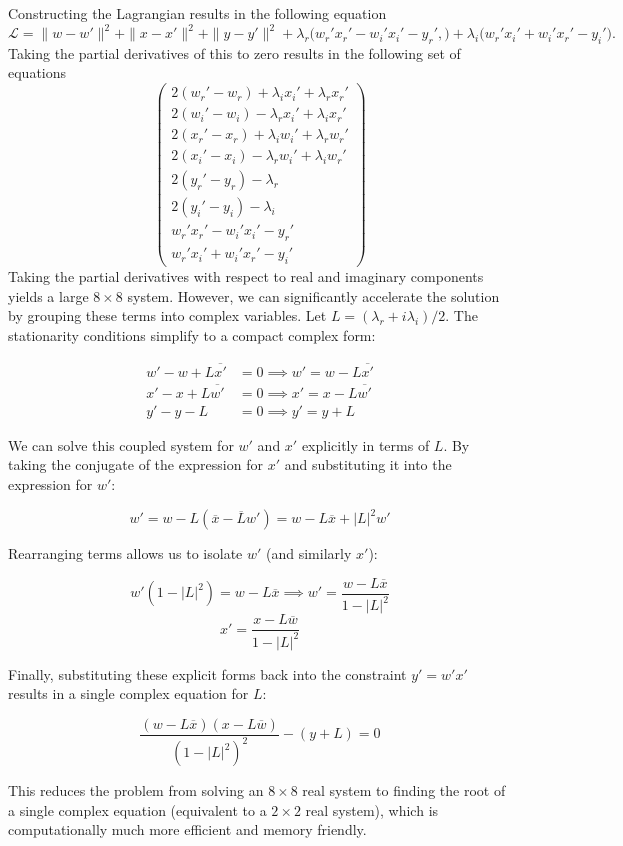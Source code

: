 \begin{itemize}
    Constructing the Lagrangian results in the following equation
    \[
    \mathcal{L}
    = \|w -w'\|^2 + \|x - x'\|^2 + \|y - y'\|^2
    + \lambda_r \big( w_r' x_r' - w_i' x_i' - y_r',\big)
    + \lambda_i \big(w_r' x_i' + w_i' x_r' - y_i'\big).
    \]
    Taking the partial derivatives of this to zero results in the following set of equations
    \[
    \left(
    \begin{array}{c}
        2(w_r' - w_r) + \lambda_i x_i' + \lambda_r x_r' \\[6pt]
        2(w_i' - w_i) - \lambda_r x_i' + \lambda_i x_r' \\[6pt]
        2(x_r' - x_r) + \lambda_i w_i' + \lambda_r w_r' \\[6pt]
        2(x_i' - x_i) - \lambda_r w_i' + \lambda_i w_r' \\[6pt]
        2(y_r' - y_r) - \lambda_r \\[6pt]
        2(y_i' - y_i) - \lambda_i \\[6pt]
        w_r' x_r' - w_i' x_i' - y_r' \\[6pt]
        w_r' x_i' + w_i' x_r' - y_i'
    \end{array}
    \right)
    \]   
    Taking the partial derivatives with respect to real and imaginary components yields a large $8 \times 8$ system. However, we can significantly accelerate the solution by grouping these terms into complex variables. Let $L = (\lambda_r + i\lambda_i)/2$. The stationarity conditions simplify to a compact complex form:
    
    \[
    \begin{aligned}
    w' - w + L \overline{x'} &= 0 \implies w' = w - L \overline{x'} \\
    x' - x + L \overline{w'} &= 0 \implies x' = x - L \overline{w'} \\
    y' - y - L &= 0 \implies y' = y + L
    \end{aligned}
    \]
    
    We can solve this coupled system for $w'$ and $x'$ explicitly in terms of $L$. By taking the conjugate of the expression for $x'$ and substituting it into the expression for $w'$:
    
    \[
    w' = w - L(\overline{x} - \overline{L} w') = w - L\overline{x} + |L|^2 w'
    \]
    
    Rearranging terms allows us to isolate $w'$ (and similarly $x'$):
    
    \[
    w'(1 - |L|^2) = w - L\overline{x} \implies w' = \frac{w - L\overline{x}}{1 - |L|^2}
    \]
    \[
    x' = \frac{x - L\overline{w}}{1 - |L|^2}
    \]
    
    Finally, substituting these explicit forms back into the constraint $y' = w'x'$ results in a single complex equation for $L$:
    
    \[
    \frac{(w - L\overline{x})(x - L\overline{w})}{(1 - |L|^2)^2} - (y + L) = 0
    \]
    
    This reduces the problem from solving an $8 \times 8$ real system to finding the root of a single complex equation (equivalent to a $2 \times 2$ real system), which is computationally much more efficient and memory friendly.

    
    \end{itemize}
